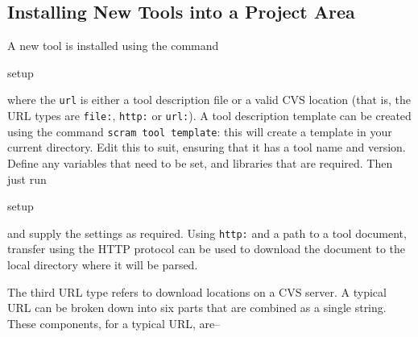 \subsection{Installing New Tools into a Project Area}\label{sec:cvsrootbreakdown}
A new tool is installed using the command

\begin{scramcmd}{setup}
  ~~~~
\end{scramcmd}

\ni where the \texttt{url} is either a tool description file or a
valid CVS location (that is, the URL types are \texttt{file:},
\texttt{http:} or \texttt{url:}).  A tool description template can be created using the
command \texttt{scram tool template}: this will create a template in
your current directory. Edit this to suit, ensuring that it has a tool
name and version. Define any variables that need to be set, and
libraries that are required. Then just run

\begin{scramcmd}{setup}
  ~
                  ~~~
\end{scramcmd}

\ni and supply the settings as required. Using \texttt{http:} and a
path to a tool document, transfer using the HTTP protocol can be used
to download the document to the local directory where it will be parsed.

\ni The third URL type refers to download locations on a CVS server. A
typical URL can be broken down into six parts that are combined as a
single string. These components, for a typical URL, are--

